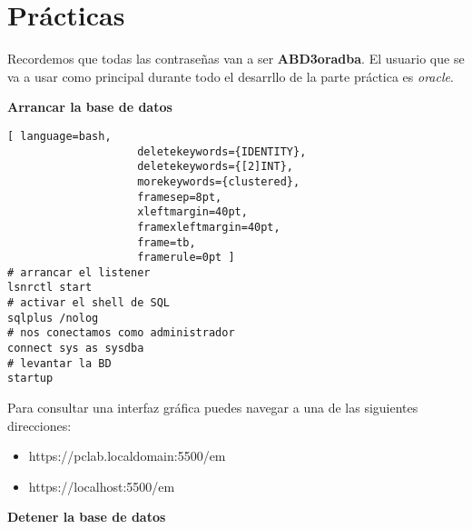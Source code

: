 \chapter{Prácticas}

Recordemos que todas las contraseñas van a ser \textbf{ABD3oradba}. El usuario que se va a usar como principal durante todo el desarrllo de la parte práctica es \textit{oracle}.

\textbf{Arrancar la base de datos}

\begin{lstlisting}[ language=bash,
                    deletekeywords={IDENTITY},
                    deletekeywords={[2]INT},
                    morekeywords={clustered},
                    framesep=8pt,
                    xleftmargin=40pt,
                    framexleftmargin=40pt,
                    frame=tb,
                    framerule=0pt ]
# arrancar el listener
lsnrctl start
# activar el shell de SQL
sqlplus /nolog
# nos conectamos como administrador
connect sys as sysdba
# levantar la BD
startup
\end{lstlisting}

Para consultar una interfaz gráfica puedes navegar a una de las siguientes direcciones:

\begin{itemize}
\item https://pclab.localdomain:5500/em
\item https://localhost:5500/em
\end{itemize}

\textbf{Detener la base de datos}

